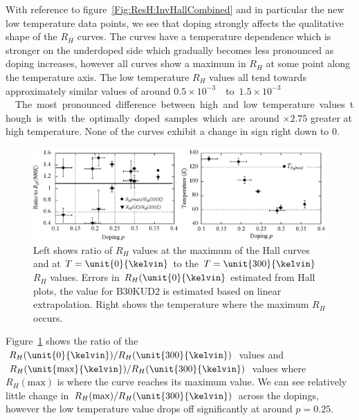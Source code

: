 With reference to figure~\ref{Fig:ResH:InvHallCombined} and in particular the new low temperature data points, we see that doping strongly affects the qualitative shape of the $R_H$ curves. The curves have a temperature dependence which is stronger on the underdoped side which gradually becomes less pronounced as doping increases, however all curves show a maximum in $R_H$ at some point along the temperature axis. The low temperature $R_H$ values all tend towards approximately similar values of around \unit{$0.5\times 10^{-3}$}{\centi\metre\cubed}to \unit{$1.5\times 10^{-3}$}{\centi\metre\cubed}. The most pronounced difference between high and low temperature values though is with the optimally doped samples which are around $\times 2.75$ greater at high temperature. None of the curves exhibit a change in sign right down to \unit{0}{\kelvin}.


\begin{figure}[htbp]
    \begin{center}
        \includegraphics[scale=0.8]{Chapter-HallBSCO/Figures/RhRatios/RhRatios}
        \caption{Left shows ratio of $R_H$ values at the maximum of the Hall curves and at $T=\unit{0}{\kelvin}$ to the $T=\unit{300}{\kelvin}$ $R_H$ values. Errors in $R_H(\unit{0}{\kelvin}$ estimated from Hall plots, the value for B30KUD2 is estimated based on linear extrapolation. Right shows the temperature where the maximum $R_H$ occurs.}
        \label{Fig:ResH:RhRatios}
    \end{center}
\end{figure}

Figure~\ref{Fig:ResH:RhRatios} shows the ratio of the $R_H(\unit{0}{\kelvin})/R_H(\unit{300}{\kelvin})$ values and $R_H(\unit{\textrm{max}}{\kelvin})/R_H(\unit{300}{\kelvin})$ values where $R_H(\textrm{max})$ is where the curve reaches its maximum value. We can see relatively little change in $R_H(\textrm{max})/R_H(\unit{300}{\kelvin})$ across the dopings, however the low temperature value drops off significantly at around $p= 0.25$.

